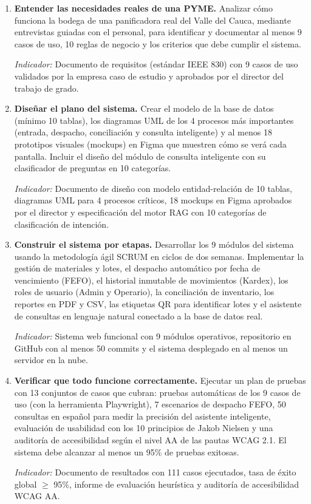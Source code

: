 \begin{enumerate}

\item \textbf{Entender las necesidades reales de una PYME.} Analizar cómo funciona la bodega de una panificadora real del Valle del Cauca, mediante entrevistas guiadas con el personal, para identificar y documentar al menos 9 casos de uso, 10 reglas de negocio y los criterios que debe cumplir el sistema.

\textit{Indicador:} Documento de requisitos (estándar IEEE 830) con 9 casos de uso validados por la empresa caso de estudio y aprobados por el director del trabajo de grado.

\item \textbf{Diseñar el plano del sistema.} Crear el modelo de la base de datos (mínimo 10 tablas), los diagramas UML de los 4 procesos más importantes (entrada, despacho, conciliación y consulta inteligente) y al menos 18 prototipos visuales (mockups) en Figma que muestren cómo se verá cada pantalla. Incluir el diseño del módulo de consulta inteligente con su clasificador de preguntas en 10 categorías.

\textit{Indicador:} Documento de diseño con modelo entidad-relación de 10 tablas, diagramas UML para 4 procesos críticos, 18 mockups en Figma aprobados por el director y especificación del motor RAG con 10 categorías de clasificación de intención.

\item \textbf{Construir el sistema por etapas.} Desarrollar los 9 módulos del sistema usando la metodología ágil SCRUM en ciclos de dos semanas. Implementar la gestión de materiales y lotes, el despacho automático por fecha de vencimiento (FEFO), el historial inmutable de movimientos (Kardex), los roles de usuario (Admin y Operario), la conciliación de inventario, los reportes en PDF y CSV, las etiquetas QR para identificar lotes y el asistente de consultas en lenguaje natural conectado a la base de datos real.

\textit{Indicador:} Sistema web funcional con 9 módulos operativos, repositorio en GitHub con al menos 50 commits y el sistema desplegado en al menos un servidor en la nube.

\item \textbf{Verificar que todo funcione correctamente.} Ejecutar un plan de pruebas con 13 conjuntos de casos que cubran: pruebas automáticas de los 9 casos de uso (con la herramienta Playwright), 7 escenarios de despacho FEFO, 50 consultas en español para medir la precisión del asistente inteligente, evaluación de usabilidad con los 10 principios de Jakob Nielsen y una auditoría de accesibilidad según el nivel AA de las pautas WCAG 2.1. El sistema debe alcanzar al menos un 95\% de pruebas exitosas.

\textit{Indicador:} Documento de resultados con 111 casos ejecutados, tasa de éxito global $\geq$ 95\%, informe de evaluación heurística y auditoría de accesibilidad WCAG AA.

\end{enumerate}
